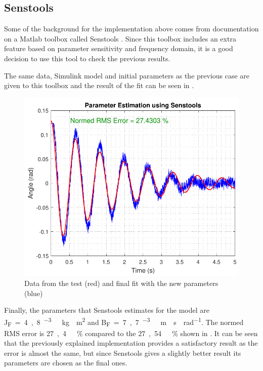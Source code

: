 \subsection{Senstools}
Some of the background for the implementation above comes from documentation on a Matlab toolbox called Senstools \cite{Senstools}. Since this toolbox includes an extra feature based on parameter sensitivity and frequency domain, it is a good decision to use this tool to check the previous results.

The same data, Simulink model and initial parameters as the previous case are given to this toolbox and the result of the fit can be seen in . 
%
\begin{figure}[H]
	\centering
	\includegraphics[scale=0.6]{figures/SenseToolParameterEstimation}
	\caption{Data from the test (red) and final fit with the new parameters (blue)}
	\label{SenseToolParameterEstimation}
\end{figure}

Finally, the parameters that Senstools estimates for the model are \si{J_F=4,8 ^{-3}\ kg \cdot m^2} and \si{B_F=7,7 ^{-3}\ m \cdot s \cdot rad^{-1}}. The normed RMS error is \si{27,4\ \%} compared to the \si{27,54\ \%} shown in . It can be seen that the previously explained implementation provides a satisfactory result as the error is almost the same, but since Senstools gives a slightly better result its parameters are chosen as the final ones.

